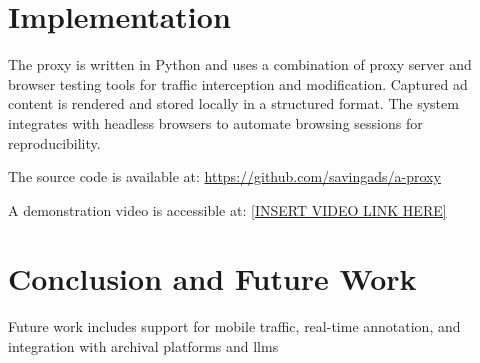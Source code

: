 \documentclass[sigconf]{acmart}
\begin{document}
\section{Implementation}
The proxy is written in Python and uses a combination of proxy server and browser testing tools for traffic interception and modification. Captured ad content is rendered and stored locally in a structured format. The system integrates with headless browsers to automate browsing sessions for reproducibility.

The source code is available at: \url{https://github.com/savingads/a-proxy}

A demonstration video is accessible at: \url{[INSERT VIDEO LINK HERE]}

\section{Conclusion and Future Work}
Future work includes support for mobile traffic, real-time annotation, and integration with archival platforms and llms



\end{document}
